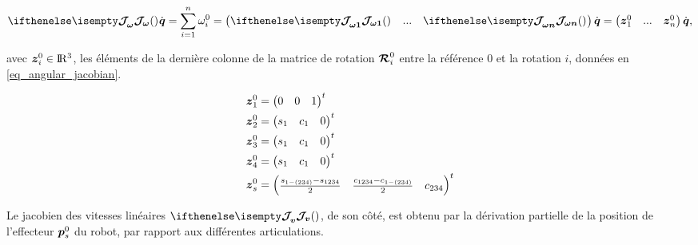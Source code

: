 \begin{appendices}
	\begin{equation} \label{eq_angular_jacobian_composition}
		\jacobian{}{\omega}{} \dot{\vect{q}} = \sum_{i=1}^{n}\omega_i^0 = 
		\begin{pmatrix}
		\jacobian{}{\omega 1}{} & ... & \jacobian{}{\omega n}{}
		\end{pmatrix} \dot{\vect{q}} =
		\begin{pmatrix}
		\vect{z}^0_1 & ... & \vect{z}^0_n
		\end{pmatrix} \dot{\vect{q}}, 
	\end{equation}
	
	avec $ \vect{z}^0_i \in \R^3 $, les éléments de la dernière colonne de la matrice de rotation $ \matrCal{R}^0_i $ entre la référence $ 0 $ et la rotation $ i $, données en \cref{eq_angular_jacobian}.
	
	\begin{equation} \label{eq_angular_jacobian}
		\begin{split}
			\vect{z}^0_1 &=  
			\begin{pmatrix}
				0 & 0 & 1 \\
			\end{pmatrix}^t \\
			\vect{z}^0_2 &=  
			\begin{pmatrix}
				s_1 & c_1 & 0 \\
			\end{pmatrix}^t \\
			\vect{z}^0_3 &=  
			\begin{pmatrix}
				s_1 & c_1 & 0 \\
			\end{pmatrix}^t \\
			\vect{z}^0_4 &=  
			\begin{pmatrix}
				s_1 & c_1 & 0 \\
			\end{pmatrix}^t \\
			\vect{z}^0_s &=  
			\begin{pmatrix}
				\frac{s_{1-(234)} - s_{1234}}{2} & \frac{c_{1234} - c_{1-(234)}}{2} & c_{234}
			\end{pmatrix}^t \\
		\end{split}
	\end{equation}
	
	Le jacobien des vitesses linéaires $ \jacobian{}{v}{} $, de son côté, est  obtenu par la dérivation partielle de la position de l'effecteur $ \vect{p}^0_s $ du robot, par rapport aux différentes articulations. 
	

\end{appendices}
